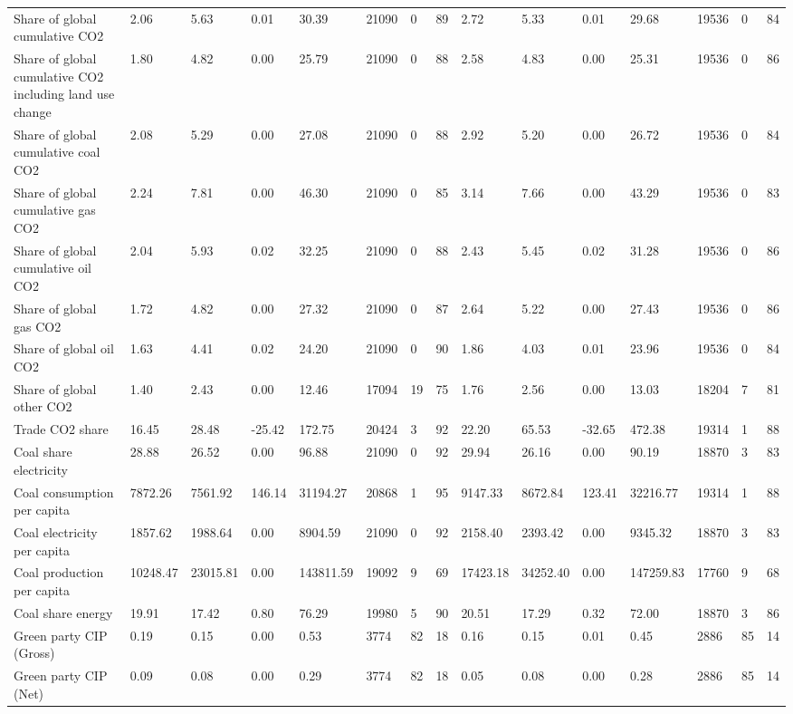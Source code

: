 \begin{longtable}{lllllllllllllll}
Share of global cumulative CO2 & 2.06 & 5.63 & 0.01 & 30.39 & 21090 & 0 & 89 & 2.72 & 5.33 & 0.01 & 29.68 & 19536 & 0 & 84\\
Share of global cumulative CO2 including land use change & 1.80 & 4.82 & 0.00 & 25.79 & 21090 & 0 & 88 & 2.58 & 4.83 & 0.00 & 25.31 & 19536 & 0 & 86\\
Share of global cumulative coal CO2 & 2.08 & 5.29 & 0.00 & 27.08 & 21090 & 0 & 88 & 2.92 & 5.20 & 0.00 & 26.72 & 19536 & 0 & 84\\
Share of global cumulative gas CO2 & 2.24 & 7.81 & 0.00 & 46.30 & 21090 & 0 & 85 & 3.14 & 7.66 & 0.00 & 43.29 & 19536 & 0 & 83\\
\addlinespace
Share of global cumulative oil CO2 & 2.04 & 5.93 & 0.02 & 32.25 & 21090 & 0 & 88 & 2.43 & 5.45 & 0.02 & 31.28 & 19536 & 0 & 86\\
Share of global gas CO2 & 1.72 & 4.82 & 0.00 & 27.32 & 21090 & 0 & 87 & 2.64 & 5.22 & 0.00 & 27.43 & 19536 & 0 & 86\\
Share of global oil CO2 & 1.63 & 4.41 & 0.02 & 24.20 & 21090 & 0 & 90 & 1.86 & 4.03 & 0.01 & 23.96 & 19536 & 0 & 84\\
Share of global other CO2 & 1.40 & 2.43 & 0.00 & 12.46 & 17094 & 19 & 75 & 1.76 & 2.56 & 0.00 & 13.03 & 18204 & 7 & 81\\
Trade CO2 share & 16.45 & 28.48 & -25.42 & 172.75 & 20424 & 3 & 92 & 22.20 & 65.53 & -32.65 & 472.38 & 19314 & 1 & 88\\
\addlinespace
Coal share electricity & 28.88 & 26.52 & 0.00 & 96.88 & 21090 & 0 & 92 & 29.94 & 26.16 & 0.00 & 90.19 & 18870 & 3 & 83\\
Coal consumption per capita & 7872.26 & 7561.92 & 146.14 & 31194.27 & 20868 & 1 & 95 & 9147.33 & 8672.84 & 123.41 & 32216.77 & 19314 & 1 & 88\\
Coal electricity per capita & 1857.62 & 1988.64 & 0.00 & 8904.59 & 21090 & 0 & 92 & 2158.40 & 2393.42 & 0.00 & 9345.32 & 18870 & 3 & 83\\
Coal production per capita & 10248.47 & 23015.81 & 0.00 & 143811.59 & 19092 & 9 & 69 & 17423.18 & 34252.40 & 0.00 & 147259.83 & 17760 & 9 & 68\\
Coal share energy & 19.91 & 17.42 & 0.80 & 76.29 & 19980 & 5 & 90 & 20.51 & 17.29 & 0.32 & 72.00 & 18870 & 3 & 86\\
\addlinespace
Green party CIP (Gross) & 0.19 & 0.15 & 0.00 & 0.53 & 3774 & 82 & 18 & 0.16 & 0.15 & 0.01 & 0.45 & 2886 & 85 & 14\\
Green party CIP (Net) & 0.09 & 0.08 & 0.00 & 0.29 & 3774 & 82 & 18 & 0.05 & 0.08 & 0.00 & 0.28 & 2886 & 85 & 14\\

\end{longtable}
